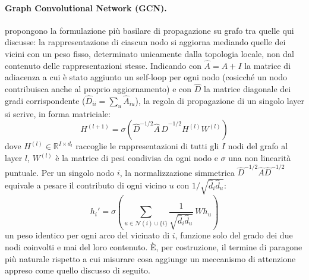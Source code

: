 \paragraph{Graph Convolutional Network (GCN).} \citet{kipf2017gcn} propongono la
formulazione più basilare di propagazione su grafo tra quelle qui
discusse: la rappresentazione di ciascun nodo si aggiorna mediando quelle
dei vicini con un peso fisso, determinato unicamente dalla topologia locale,
non dal contenuto delle rappresentazioni stesse. Indicando con
$\hat A = A + I$ la matrice di adiacenza a cui è stato aggiunto un
self-loop per ogni nodo (cosicché un nodo contribuisca anche al proprio
aggiornamento) e con $\hat D$ la matrice diagonale dei gradi corrispondente
($\hat D_{ii} = \sum_u \hat A_{iu}$), la regola di propagazione di un
singolo layer si scrive, in forma matriciale:
\begin{equation}
  H^{(l+1)} = \sigma\!\left(\hat D^{-1/2} \hat A\, \hat D^{-1/2} H^{(l)} W^{(l)}\right)
  \label{eq:gcn-propagation}
\end{equation}
dove $H^{(l)} \in \mathbb{R}^{I \times d_l}$ raccoglie le rappresentazioni
di tutti gli $I$ nodi del grafo al layer $l$, $W^{(l)}$ è la matrice di
pesi condivisa da ogni nodo e $\sigma$ una non linearità puntuale. Per un
singolo nodo $i$, la normalizzazione simmetrica
$\hat D^{-1/2}\hat A\hat D^{-1/2}$ equivale a pesare il contributo di ogni
vicino $u$ con $1/\sqrt{\hat d_i \hat d_u}$:
\begin{equation}
  h_i' = \sigma\!\left(\sum_{u \in \mathcal{N}(i) \cup \{i\}}
    \frac{1}{\sqrt{\hat d_i \hat d_u}}\, W h_u\right)
  \label{eq:gcn-aggregate}
\end{equation}
un peso identico per ogni arco del vicinato di $i$, funzione solo del grado
dei due nodi coinvolti e mai del loro contenuto. È, per costruzione, il
termine di paragone più naturale rispetto a cui misurare cosa aggiunge un
meccanismo di attenzione appreso come quello discusso di seguito.


